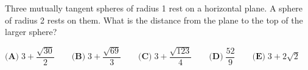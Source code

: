 Three mutually tangent spheres of radius 1 rest on a horizontal plane. A sphere of radius 2 rests on them. What is the distance from the plane to the top of the larger sphere?



$ \textbf{(A)}\; 3+\dfrac{\sqrt{30}}{2}\qquad
\textbf{(B)}\; 3+\dfrac{\sqrt{69}}{3}\qquad
\textbf{(C)}\; 3+\dfrac{\sqrt{123}}{4}\qquad
\textbf{(D)}\; \dfrac{52}{9}\qquad
\textbf{(E)}\; 3+2\sqrt{2} $
